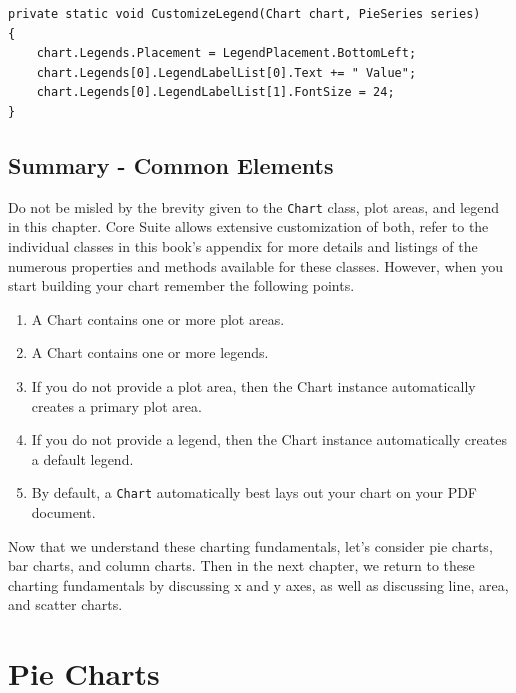 \documentclass[american,letterpaper]{tufte-book}
\numberwithin{equation}{section}
\numberwithin{figure}{section}
\begin{document}
{\begin{figure}
\end{figure}

\bgroup{}
\begin{lstlisting}[caption={Customizing a legend.},label={lis:Customizing-a-legend.},basicstyle={\small\ttfamily},breaklines=true]
private static void CustomizeLegend(Chart chart, PieSeries series)
{
    chart.Legends.Placement = LegendPlacement.BottomLeft;
    chart.Legends[0].LegendLabelList[0].Text += " Value";
    chart.Legends[0].LegendLabelList[1].FontSize = 24;
}
\end{lstlisting}
\leavevmode\egroup


\subsection{Summary - Common Elements}

Do not be misled by the brevity given to the \texttt{Chart} class,
plot areas, and legend in this chapter. Core Suite allows extensive
customization of both, refer to the individual classes in this book's
appendix for more details and listings of the numerous properties
and methods available for these classes. However, when you start building
your chart remember the following points.
\begin{enumerate}
\item A Chart contains one or more plot areas.
\item A Chart contains one or more legends.
\item If you do not provide a plot area, then the Chart instance automatically
creates a primary plot area.
\item If you do not provide a legend, then the Chart instance automatically
creates a default legend. 
\item By default, a \texttt{Chart} automatically best lays out your chart
on your PDF document.
\end{enumerate}
Now that we understand these charting fundamentals, let's consider
pie charts, bar charts, and column charts. Then in the next chapter,
we return to these charting fundamentals by discussing x and y axes,
as well as discussing line, area, and scatter charts.

\section{Pie Charts}\label{sec:Pie-Charts}

}
\end{document}
